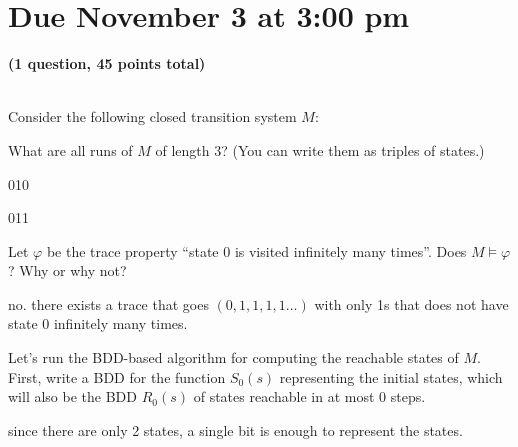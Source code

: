 \documentclass[11pt]{article}
\begin{document}
\maketitle

\section*{Due November 3 at 3:00 pm}

\textbf{(1 question, 45 points total)}

\begin{qunlist}

  \\
  Consider the following closed transition system $M$:


  \begin{qparts}
  \item
    What are all runs of $M$ of length 3? (You can write them as triples of states.)

    \begin{answer}
      010

      011


    \end{answer}

  \item
    Let $\varphi$ be the trace property ``state 0 is visited infinitely many times''.
    Does $M \models \varphi$?
    Why or why not?

    \begin{answer}
      no. there exists a trace that goes \((0,1,1,1,1\dots)\) with only 1s that does not have state 0 infinitely many times.
    \end{answer}

  \item
    Let's run the BDD-based algorithm for computing the reachable states of $M$.
    First, write a BDD for the function $S_0(s)$ representing the initial states, which will also be the BDD $R_0(s)$ of states reachable in at most 0 steps.

    \begin{answer}
      since there are only 2 states, a single bit is enough to represent the states.


\end{answer}
\end{qparts}
\end{qunlist}
\end{document}
